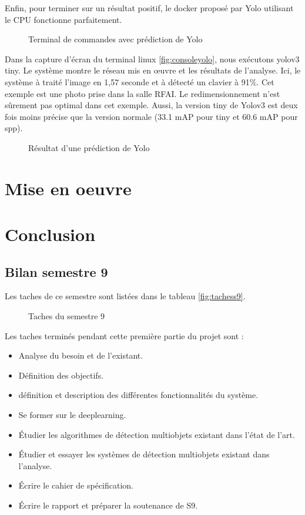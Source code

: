 \documentclass[debug,nodate,hideweeklyreports,noposter]{polytech/polytech}
\begin{document}
Enfin, pour terminer sur un résultat positif, le docker proposé par Yolo utilisant le CPU fonctionne parfaitement. 
\begin{figure}
  \caption{Terminal de commandes avec prédiction de Yolo}
  \label{fig:consoleyolo}
\end{figure}
Dans la capture d’écran du terminal linux \autoref{fig:consoleyolo}, nous exécutons yolov3 tiny. Le système montre le réseau mis en œuvre et les résultats de l’analyse. Ici, le système à traité l’image en 1,57 seconde et à détecté un clavier à 91\%. Cet exemple est une photo prise dans la salle RFAI. Le redimensionnement n’est sûrement pas optimal dans cet exemple. Aussi, la version tiny de Yolov3 est deux fois moins précise que la version normale (33.1 mAP pour tiny et 60.6 mAP pour spp).

\begin{figure}
  \caption{Résultat d'une prédiction de Yolo}
  \label{fig:imgpredictyolo}
\end{figure}

\chapter{Mise en oeuvre}

\chapter{Conclusion}

\section{Bilan semestre 9}

Les taches de ce semestre sont listées dans le tableau \autoref{fig:tachess9}.

\begin{figure}
  \caption{Taches du semestre 9}
  \label{fig:tachess9}
\end{figure}

Les taches terminés pendant cette première partie du projet sont :

\begin{itemize}
\item Analyse du besoin et de l'existant.
\item Définition des objectifs.
\item définition et description des différentes fonctionnalités du système.
\item Se former sur le \gls{deeplearning}.
\item Étudier les algorithmes de détection multiobjets existant dans l'état de l'art.
\item Étudier et essayer les systèmes de détection multiobjets existant dans l'analyse.
\item Écrire le cahier de spécification.
\item Écrire le rapport et préparer la soutenance de S9.
\end{itemize}
\end{document}
